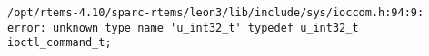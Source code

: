 
\noindent\begin{minipage}{\textwidth}
\begin{lstlisting}[language={}]
/opt/rtems-4.10/sparc-rtems/leon3/lib/include/sys/ioccom.h:94:9: error: unknown type name 'u_int32_t' typedef u_int32_t ioctl_command_t;
\end{lstlisting}
\end{minipage}